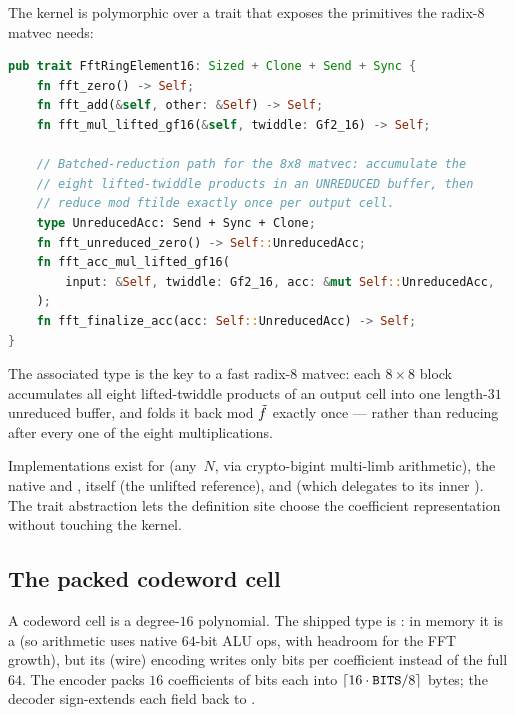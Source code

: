 The kernel is polymorphic over a  trait that
exposes the primitives the radix-8 matvec needs:

\begin{lstlisting}[language=Rust]
pub trait FftRingElement16: Sized + Clone + Send + Sync {
    fn fft_zero() -> Self;
    fn fft_add(&self, other: &Self) -> Self;
    fn fft_mul_lifted_gf16(&self, twiddle: Gf2_16) -> Self;

    // Batched-reduction path for the 8x8 matvec: accumulate the
    // eight lifted-twiddle products in an UNREDUCED buffer, then
    // reduce mod ftilde exactly once per output cell.
    type UnreducedAcc: Send + Sync + Clone;
    fn fft_unreduced_zero() -> Self::UnreducedAcc;
    fn fft_acc_mul_lifted_gf16(
        input: &Self, twiddle: Gf2_16, acc: &mut Self::UnreducedAcc,
    );
    fn fft_finalize_acc(acc: Self::UnreducedAcc) -> Self;
}
\end{lstlisting}

The  associated type is the key to a fast radix-8
matvec: each $8 \times 8$ block accumulates all eight
lifted-twiddle products of an output cell into one length-$31$
unreduced buffer, and folds it back mod $\tilde f$ exactly once ---
rather than reducing after every one of the eight multiplications.

Implementations exist for  (any~$N$,
via crypto-bigint multi-limb arithmetic), the native
 and ,
 itself (the unlifted reference), and
 (which delegates to its inner
). The trait abstraction lets the
 definition site choose the coefficient representation
without touching the kernel.

\subsection{The packed codeword cell}
\label{sec:packed-cw}

A codeword cell is a degree-$16$ polynomial. The shipped 
type is : in memory it is a
 (so arithmetic uses native $64$-bit
ALU ops, with headroom for the FFT growth), but its 
(wire) encoding writes only  bits per coefficient instead of
the full $64$. The encoder packs $16$ coefficients of  bits
each into $\lceil 16 \cdot \texttt{BITS} / 8 \rceil$ bytes; the decoder
sign-extends each field back to .

